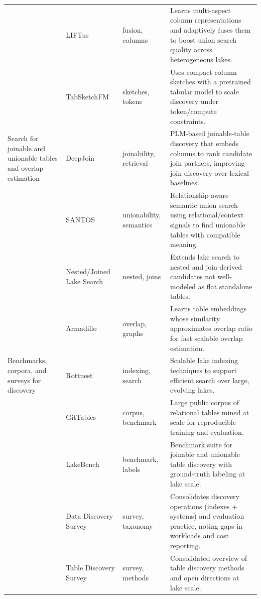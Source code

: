 \documentclass[sigconf,nonacm]{acmart}
\begin{document}
\begin{table}[!htbp]
\begin{tabularx}{\textwidth}{@{}p{24mm}p{28mm}p{18mm}Y@{}}
~ &
LIFTus~\cite{11113165} &
fusion, columns &
Learns multi-aspect column representations and adaptively fuses them to boost union search quality across heterogeneous lakes. \\

~ &
TabSketchFM~\cite{11113110} &
sketches, tokens &
Uses compact column sketches with a pretrained tabular model to scale discovery under token/compute constraints. \\

\midrule

Search for joinable and unionable tables and overlap estimation &
DeepJoin~\cite{10.14778/3603581.3603587} &
joinability, retrieval &
PLM-based joinable-table discovery that embeds columns to rank candidate join partners, improving join discovery over lexical baselines. \\

~ &
SANTOS~\cite{10.1145/3588689} &
unionability, semantics &
Relationship-aware semantic union search using relational/context signals to find unionable tables with compatible meaning. \\

~ &
Nested/Joined Lake Search~\cite{10.14778/3681954.3682005} &
nested, joins &
Extends lake search to nested and join-derived candidates not well-modeled as flat standalone tables. \\

~ &
Armadillo~\cite{10.1145/3725365} &
overlap, graphs &
Learns table embeddings whose similarity approximates overlap ratio for fast scalable overlap estimation. \\

\midrule

Benchmarks, corpora, and surveys for discovery &
Rottnest~\cite{11113229} &
indexing, search &
Scalable lake indexing techniques to support efficient search over large, evolving lakes. \\

~ &
GitTables~\cite{10.1145/3588710} &
corpus, benchmark &
Large public corpus of relational tables mined at scale for reproducible training and evaluation. \\

~ &
LakeBench~\cite{10.14778/3659437.3659448} &
benchmark, labels &
Benchmark suite for joinable and unionable table discovery with ground-truth labeling at lake scale. \\

~ &
Data Discovery Survey~\cite{10.14778/3750601.3750694} &
survey, taxonomy &
Consolidates discovery operations (indexes + systems) and evaluation practice, noting gaps in workloads and cost reporting. \\

~ &
Table Discovery Survey~\cite{10.1145/3555041.3589409} &
survey, methods &
Consolidated overview of table discovery methods and open directions at lake scale. \\

\bottomrule
\end{tabularx}
\end{table}
\end{document}
